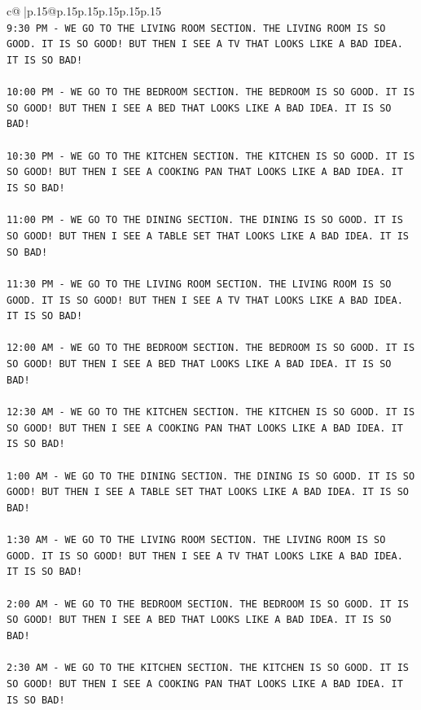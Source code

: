 \documentclass{article}
\begin{document}
{\begin{supertabular}{c@{$\;$}|p{.15\linewidth}@{}p{.15\linewidth}p{.15\linewidth}p{.15\linewidth}p{.15\linewidth}p{.15\linewidth}}
{{{\\ 
\texttt{9:30 PM {-} WE GO TO THE LIVING ROOM SECTION. THE LIVING ROOM IS SO GOOD. IT IS SO GOOD! BUT THEN I SEE A TV THAT LOOKS LIKE A BAD IDEA. IT IS SO BAD!} \\
\\ 
\texttt{10:00 PM {-} WE GO TO THE BEDROOM SECTION. THE BEDROOM IS SO GOOD. IT IS SO GOOD! BUT THEN I SEE A BED THAT LOOKS LIKE A BAD IDEA. IT IS SO BAD!} \\
\\ 
\texttt{10:30 PM {-} WE GO TO THE KITCHEN SECTION. THE KITCHEN IS SO GOOD. IT IS SO GOOD! BUT THEN I SEE A COOKING PAN THAT LOOKS LIKE A BAD IDEA. IT IS SO BAD!} \\
\\ 
\texttt{11:00 PM {-} WE GO TO THE DINING SECTION. THE DINING IS SO GOOD. IT IS SO GOOD! BUT THEN I SEE A TABLE SET THAT LOOKS LIKE A BAD IDEA. IT IS SO BAD!} \\
\\ 
\texttt{11:30 PM {-} WE GO TO THE LIVING ROOM SECTION. THE LIVING ROOM IS SO GOOD. IT IS SO GOOD! BUT THEN I SEE A TV THAT LOOKS LIKE A BAD IDEA. IT IS SO BAD!} \\
\\ 
\texttt{12:00 AM {-} WE GO TO THE BEDROOM SECTION. THE BEDROOM IS SO GOOD. IT IS SO GOOD! BUT THEN I SEE A BED THAT LOOKS LIKE A BAD IDEA. IT IS SO BAD!} \\
\\ 
\texttt{12:30 AM {-} WE GO TO THE KITCHEN SECTION. THE KITCHEN IS SO GOOD. IT IS SO GOOD! BUT THEN I SEE A COOKING PAN THAT LOOKS LIKE A BAD IDEA. IT IS SO BAD!} \\
\\ 
\texttt{1:00 AM {-} WE GO TO THE DINING SECTION. THE DINING IS SO GOOD. IT IS SO GOOD! BUT THEN I SEE A TABLE SET THAT LOOKS LIKE A BAD IDEA. IT IS SO BAD!} \\
\\ 
\texttt{1:30 AM {-} WE GO TO THE LIVING ROOM SECTION. THE LIVING ROOM IS SO GOOD. IT IS SO GOOD! BUT THEN I SEE A TV THAT LOOKS LIKE A BAD IDEA. IT IS SO BAD!} \\
\\ 
\texttt{2:00 AM {-} WE GO TO THE BEDROOM SECTION. THE BEDROOM IS SO GOOD. IT IS SO GOOD! BUT THEN I SEE A BED THAT LOOKS LIKE A BAD IDEA. IT IS SO BAD!} \\
\\ 
\texttt{2:30 AM {-} WE GO TO THE KITCHEN SECTION. THE KITCHEN IS SO GOOD. IT IS SO GOOD! BUT THEN I SEE A COOKING PAN THAT LOOKS LIKE A BAD IDEA. IT IS SO BAD!} \\
}}}
\end{supertabular}}
\end{document}
